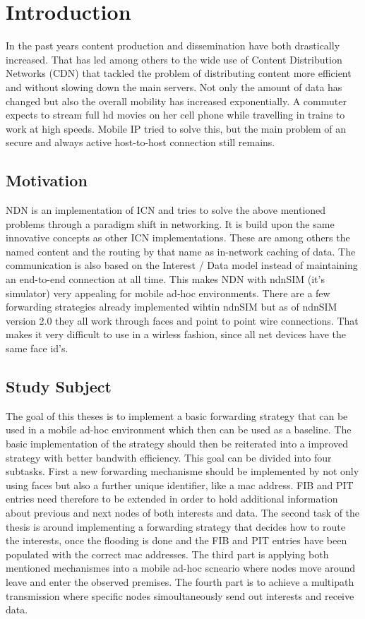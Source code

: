 \chapter{Introduction}

In the past years content production and dissemination have both drastically increased. That has led among others to the wide use of Content Distribution Networks (CDN) that tackled the problem of distributing content more efficient and without slowing down the main servers. Not only the amount of data has changed but also the overall mobility has increased exponentially. A commuter expects to stream full hd movies on her cell phone while travelling in trains to work at high speeds. Mobile IP tried to solve this, but the main problem of an secure and always active host-to-host connection still remains.

\section{Motivation}

NDN is an implementation of ICN and tries to solve the above mentioned problems through a paradigm shift in networking. It is build upon the same innovative concepts as other ICN implementations. These are among others the named content and the routing by that name as in-network caching of data. The communication is also based on the Interest / Data model instead of maintaining an end-to-end connection at all time. This makes NDN with ndnSIM (it's simulator) very appealing for mobile ad-hoc environments. There are a few forwarding strategies already implemented wihtin ndnSIM but as of ndnSIM version 2.0 they all work through faces and point to point wire connections. That makes it very difficult to use in a wirless fashion, since all net devices have the same face id's.

\newpage
\section{Study Subject}

The goal of this theses is to implement a basic forwarding strategy that can be used in a mobile ad-hoc environment which then can be used as a baseline. The basic implementation of the strategy should then be reiterated into a improved strategy with better bandwith efficiency. This goal can be divided into four subtasks. First a new forwarding mechanisme should be implemented by not only using faces but also a further unique identifier, like a mac address. FIB and PIT entries need therefore to be extended in order to hold additional information about previous and next nodes of both interests and data. The second task of the thesis is around implementing a forwarding strategy that decides how to route the interests, once the flooding is done and the FIB and PIT entries have been populated with the correct mac addresses. The third part is applying both mentioned mechanismes into a mobile ad-hoc scneario where nodes move around leave and enter the observed premises. The fourth part is to achieve a multipath transmission where specific nodes simoultaneously send out interests and receive data.

